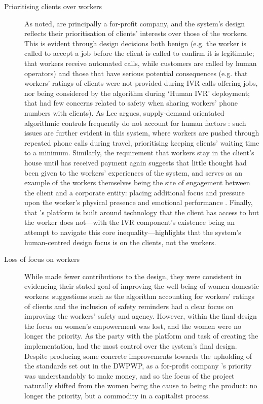 \begin{description}
    \item[Prioritising clients over workers] As noted, \PC{} are principally a for-profit company, and the system's design reflects their prioritisation of clients' interests over those of the workers. This is evident through design decisions both benign (e.g. the worker is called to accept a job before the client is called to confirm it is legitimate; that workers receive automated calls, while customers are called by human operators) and those that have serious potential consequences (e.g. that workers' ratings of clients were not provided during IVR calls offering jobs, nor being considered by the algorithm during `Human IVR' deployment; that \PC{} had few concerns related to safety when sharing workers' phone numbers with clients). As Lee argues, supply-demand orientated algorithmic controls frequently do not account for human factors \citep{lee2015}: such issues are further evident in this system, where workers are pushed through repeated phone calls during travel, prioritising keeping clients' waiting time to a minimum. Similarly, the requirement that workers stay in the client's house until \PC{} has received payment again suggests that little thought had been given to the workers' experiences of the system, and serves as an example of the workers themselves being the site of engagement between the client and a corporate entity: placing additional focus and pressure upon the worker's physical presence and emotional performance \cite{raval2016}. Finally, that \PC{}'s platform is built around technology that the client has access to but the worker does not---with the IVR component's existence being an attempt to navigate this core inequality---highlights that the system's human-centred design focus is on the clients, not the workers.
    
    \item[Loss of focus on workers] While \NGO{} made fewer contributions to the design, they were consistent in evidencing their stated goal of improving the well-being of women domestic workers: suggestions such as the algorithm accounting for workers' ratings of clients and the inclusion of safety reminders had a clear focus on improving the workers' safety and agency. However, within the final design the focus on women's empowerment was lost, and the women were no longer the priority. As the party with the platform and task of creating the implementation, \PC{} had the most control over the system's final design. Despite producing some concrete improvements towards the upholding of the standards set out in the DWPWP, as a for-profit company \PC{}'s priority was understandably to make money, and so the focus of the project naturally shifted from the women being the cause to being the product: no longer the priority, but a commodity in a capitalist process. 
    
\end{description}


